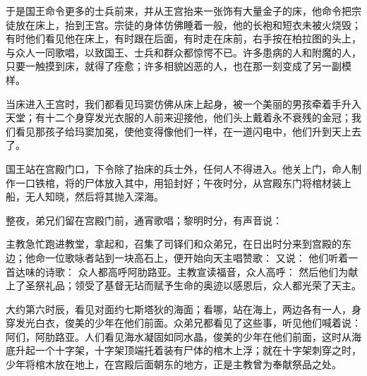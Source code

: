 于是国王命令更多的士兵前来，并从王宫抬来一张饰有大量金子的床，他命令把宗徒放在床上，抬到王宫。宗徒的身体仿佛睡着一般，他的长袍和短衣未被火烧毁；有时他们看见他在床上，有时跟在后面，有时走在床前，右手按在柏拉图的头上，与众人一同歌唱，以致国王、士兵和群众都惊愕不已。许多患病的人和附魔的人，只要一触摸到床，就得了痊愈；许多相貌凶恶的人，也在那一刻变成了另一副模样。\par

当床进入王宫时，我们都看见玛窦仿佛从床上起身，被一个美丽的男孩牵着手升入天堂；有十二个身穿发光衣服的人前来迎接他，他们头上戴着永不衰残的金冠；我们看见那孩子给玛窦加冕，使他变得像他们一样，在一道闪电中，他们升到天上去了。\par

国王站在宫殿门口，下令除了抬床的兵士外，任何人不得进入。他关上门，命人制作一口铁棺，将的尸体放入其中，用铅封好；午夜时分，从宫殿东门将棺材装上船，无人知晓，然后将其抛入深海。\par

整夜，弟兄们留在宫殿门前，通宵歌唱；黎明时分，有声音说：\par

主教急忙跑进教堂，拿起和，召集了司铎们和众弟兄，在日出时分来到宫殿的东边；他命一位歌咏者站到一块高石上，便开始向天主唱赞歌： 又说： 他们听着一首达味的诗歌： 众人都高呼阿肋路亚。主教宣读福音，众人高呼： 然后他们为献上了圣祭礼品；领受了基督无玷而赋予生命的奥迹以感恩后，众人都光荣了天主。\par

大约第六时辰，看见对面约七斯塔狄的海面；看哪，站在海上，两边各有一人，身穿发光白衣，俊美的少年在他们前面。众弟兄都看见了这些事，听见他们喊着说：阿们，阿肋路亚。人们看见海水凝固如同水晶，俊美的少年在他们前面，这时从海底升起一个十字架，十字架顶端托着装有尸体的棺木上浮；就在十字架刺穿之时，少年将棺木放在地上，在宫殿后面朝东的地方，正是主教曾为奉献祭品之处。\par

